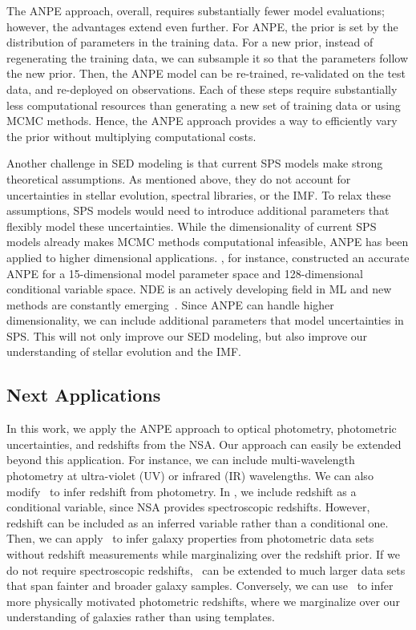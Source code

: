 The ANPE approach, overall, requires substantially fewer model evaluations; 
however, the advantages extend even further. 
For ANPE, the prior is set by the distribution of parameters in the training
data. 
For a new prior, instead of regenerating the training data, we can subsample
it so that the parameters follow the new prior. 
Then, the ANPE model can be re-trained, re-validated on the test data, and
re-deployed on observations.
Each of these steps require substantially less computational resources than
generating a new set of training data or using MCMC methods. 
Hence, the ANPE approach provides a way to efficiently vary the prior without
multiplying computational costs.

Another challenge in SED modeling is that current SPS models make strong
theoretical assumptions.
As mentioned above, they do not account for uncertainties in stellar evolution,
spectral libraries, or the IMF. 
To relax these assumptions, SPS models would need to introduce additional
parameters that flexibly model these uncertainties. 
While the dimensionality of current SPS models already makes MCMC methods
computational infeasible, ANPE has been applied to higher dimensional
applications.
\cite{dax2021}, for instance, constructed an accurate ANPE for a
15-dimensional model parameter space and 128-dimensional conditional variable
space.
NDE is an actively developing field in ML and new methods are constantly
emerging~\citep[\eg][]{wu2020, dhariwal2021}. 
Since ANPE can handle higher dimensionality, we can include additional
parameters that model uncertainties in SPS. 
This will not only improve our SED modeling, but also improve our understanding
of stellar evolution and the IMF. 

\subsection{Next Applications} 
In this work, we apply the ANPE approach to optical photometry, photometric
uncertainties, and redshifts from the NSA. 
Our approach can easily be extended beyond this application. 
For instance, we can include multi-wavelength photometry at ultra-violet (UV)
or infrared (IR) wavelengths. 
We can also modify \sedflow~to infer redshift from photometry. 
In \sedflow, we include redshift as a conditional variable, since NSA provides
spectroscopic redshifts. 
However, redshift can be included as an inferred variable rather than a
conditional one. 
Then, we can apply \sedflow~to infer galaxy properties from photometric data
sets without redshift measurements while marginalizing over the redshift
prior. 
If we do not require spectroscopic redshifts, \sedflow~can be extended to much
larger data sets that span fainter and broader galaxy samples. 
Conversely, we can use \sedflow~to infer more physically motivated photometric 
redshifts, where we marginalize over our understanding of galaxies rather than
using templates. 

